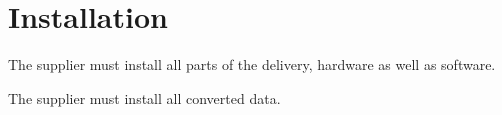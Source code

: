 \documentclass[Main]{subfiles}
\begin{document}
\section{Installation}

\begin{DocTable}
\Doc
{The supplier must install all parts of the delivery, hardware as well as software.}
{}
{}

\Doc
{The supplier must install all converted data.}
{}
{}

\end{DocTable}
\end{document}
